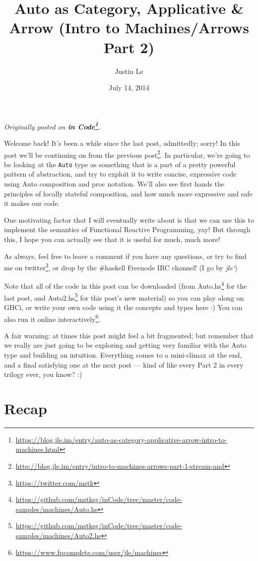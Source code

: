 \documentclass[]{article}
\title{Auto as Category, Applicative \& Arrow (Intro to Machines/Arrows Part 2)}
\author{Justin Le}
\date{July 14, 2014}
\renewcommand{\href}[2]{#2\footnote{\url{#1}}}
\begin{document}
\maketitle

\emph{Originally posted on
\textbf{\href{https://blog.jle.im/entry/auto-as-category-applicative-arrow-intro-to-machines.html}{in
Code}}.}

Welcome back! It's been a while since the last post, admittedly; sorry! In this
post we'll be continuing on from
\href{http://blog.jle.im/entry/intro-to-machines-arrows-part-1-stream-and}{the
previous post}. In particular, we're going to be looking at the \texttt{Auto}
type as something that is a part of a pretty powerful pattern of abstraction,
and try to exploit it to write concise, expressive code using Auto composition
and proc notation. We'll also see first hands the principles of locally stateful
composition, and how much more expressive and safe it makes our code.

One motivating factor that I will eventually write about is that we can use this
to implement the semantics of Functional Reactive Programming, yay! But through
this, I hope you can actually see that it is useful for much, much more!

As always, feel free to leave a comment if you have any questions, or try to
find me on \href{https://twitter.com/mstk}{twitter}, or drop by the \#haskell
Freenode IRC channel! (I go by \emph{jle`})

Note that all of the code in this post can be downloaded (from
\href{https://github.com/mstksg/inCode/tree/master/code-samples/machines/Auto.hs}{Auto.hs}
for the last post, and
\href{https://github.com/mstksg/inCode/tree/master/code-samples/machines/Auto2.hs}{Auto2.hs}
for this post's new material) so you can play along on GHCi, or write your own
code using it the concepts and types here :) You can also run it
\href{https://www.fpcomplete.com/user/jle/machines}{online interactively}.

A fair warning: at times this post might feel a bit fragmented; but remember
that we really are just going to be exploring and getting very familiar with the
Auto type and building an intuition. Everything comes to a mini-climax at the
end, and a final satisfying one at the next post --- kind of like every Part 2
in every trilogy ever, you know? :)

\section{Recap}\label{recap}
\end{document}
